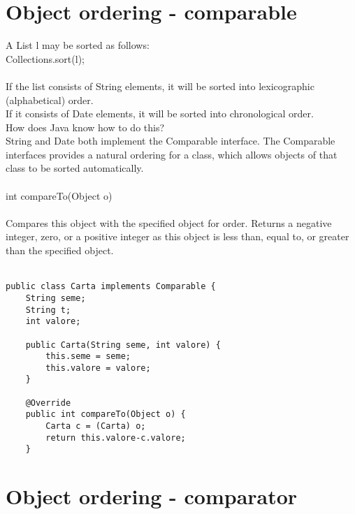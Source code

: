 \documentclass[10pt,a4paper]{article}
\begin{document}
\newpage
\section{Object ordering - comparable}
A List l may be sorted as follows: \\
Collections.sort(l); \\\\
If the list consists of String elements, it will be sorted into lexicographic (alphabetical) order. \\
If it consists of Date elements, it will be sorted into chronological order. \\
How does Java know how to do this? \\
String and Date both implement the Comparable interface. The Comparable interfaces provides a natural ordering for a class, which allows objects of that class to be sorted automatically. \\\\
int compareTo(Object o) \\\\
Compares this object with the specified object for order. Returns a negative integer, zero, or a positive integer as this object is less than, equal to, or greater than the specified object. 
\\\\
\begin{verbatim}
public class Carta implements Comparable { 
    String seme;
    String t;
    int valore;
    
    public Carta(String seme, int valore) {
        this.seme = seme;
        this.valore = valore;
    }
    
    @Override
    public int compareTo(Object o) {
        Carta c = (Carta) o;
        return this.valore-c.valore;
    }

\end{verbatim}

\newpage
\section{Object ordering - comparator}
\end{document}
